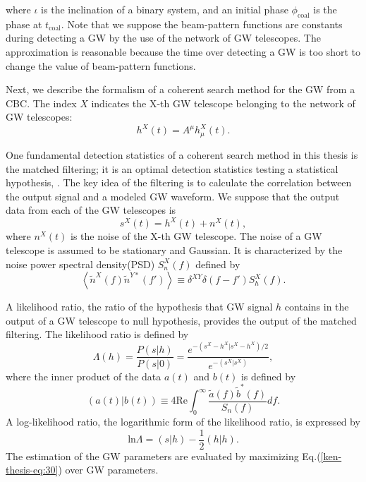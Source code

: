 \documentclass[%
 aps,
 prd,
 amsmath,amssymb,
 reprint,%
superscriptaddress
]{revtex4-1}
\begin{document}
where
$\iota$ is the inclination of a binary system, and an initial phase
$\phi_{\mathrm{coal}}$ is the phase at
$t_{\mathrm{coal}}$. Note that we suppose the beam-pattern functions are constants during detecting a GW by the use of the network of GW telescopes. The approximation is reasonable because the time over detecting a GW is too short to change the value of beam-pattern functions.

Next, we describe the formalism of a coherent search method for the GW from a CBC. The index
$X$ indicates the X-th GW telescope belonging to the network of GW telescopes:
\begin{equation}\label{ken-thesis-eq:25}
 h^{X}(t)=A^{\mu}h^{X}_{\mu}(t).
\end{equation}

One fundamental detection statistics of a coherent search method in this thesis is the matched filtering; it is an optimal detection statistics testing a statistical hypothesis\cite{2499}, \cite{lrr-2009-2}. The key idea of the filtering is to calculate the correlation between the output signal and a modeled GW waveform. We suppose that the output data from each of the GW telescopes is
\begin{equation}\label{ken-thesis-eq:26}
 s^{X}(t) = h^{X}(t)+n^{X}(t),
\end{equation}
where
$n^{X}(t)$ is the noise of the X-th GW telescope. The noise of a GW telescope is assumed to be stationary and Gaussian. It is characterized by the noise power spectral density(PSD)
$S^{X}_{n}(f)$ defined by
\begin{equation}\label{ken-thesis-eq:27}
  \left\langle \tilde{n}^{X}(f)\tilde{n}^{Y*}(f')\right\rangle\equiv \delta^{XY}\delta(f-f')S^{X}_{h}(f).
\end{equation}

A likelihood ratio, the ratio of the hypothesis that GW signal 
$h$ contains in the output of a GW telescope to null hypothesis, provides the output of the matched filtering. The likelihood ratio is defined by
\begin{equation}\label{ken-thesis-eq:29}
 \Lambda(h)=\frac{P(s|h)}{P(s|0)}=\frac{e^{-(s^{X}-h^{X}|s^{X}-h^{X})/2}}{e^{-(s^{X}|s^{X})}},
\end{equation}
where the inner product of the data
$a(t)$ and
$b(t)$ is defined by
\begin{equation}\label{ken-thesis-eq:28}
  \left(a(t)|b(t)\right)\equiv 4\mathrm{Re}\int^{\infty}_{0}\frac{\tilde{a}(f)\tilde{b}^{*}(f)}{S_{n}(f)}df.
\end{equation}
A log-likelihood ratio, the logarithmic form of the likelihood ratio, is expressed by
\begin{equation}\label{ken-thesis-eq:30}
 \mathrm{ln}\Lambda=(s|h)-\frac{1}{2}(h|h).
\end{equation}
The estimation of the GW parameters are evaluated by maximizing Eq.(\ref{ken-thesis-eq:30}) over GW parameters.
\end{document}
